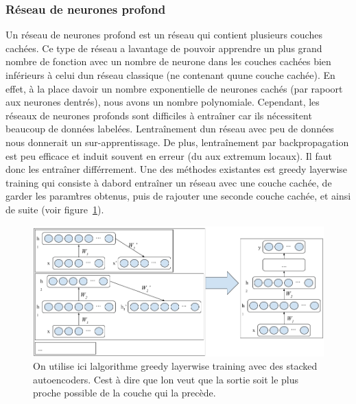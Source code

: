 \documentclass[11pt]{sdm}
\begin{document}
		\subsubsection{R\'eseau de neurones profond}
			Un r\'eseau de neurones profond est un r\'eseau qui contient plusieurs couches cach\'ees. Ce type de r\'eseau a l\textquotesingle avantage de pouvoir apprendre un plus grand nombre de fonction avec un nombre de neurone dans les couches cach\'ees bien inf\'erieurs \`a celui d\textquotesingle un r\'eseau classique (ne contenant qu\textquotesingle une couche cach\'ee). En effet, \`a la place d\textquotesingle avoir un nombre exponentielle de neurones cach\'es (par rapoort aux neurones d\textquotesingle entr\'es), nous avons un nombre polynomiale.
			Cependant, les r\'eseaux de neurones profonds sont difficiles \`a entra\^iner car ils n\'ecessitent beaucoup de donn\'ees label\'ees. L\textquotesingle entra\^inement d\textquotesingle un r\'eseau avec peu de donn\'ees nous donnerait un sur-apprentissage. De plus, l\textquotesingle entra\^inement par backpropagation est peu efficace et induit souvent en erreur (du aux extremum locaux). Il faut donc les entra\^iner diff\'errement.
			Une des m\'ethodes existantes est greedy layerwise training qui consiste \`a d\textquotesingle abord entra\^iner un r\'eseau avec une couche cach\'ee, de garder les param\`tres obtenus, puis de rajouter une seconde couche cach\'ee, et ainsi de suite (voir figure~\ref{fig:trainDeepNet}).

			\begin{figure}[!ht]
				\centering
				\includegraphics[scale=0.5,natwidth=919,natheight=412]{figures/trainDeepNetByGreedyLayerWise.png}
				\caption{On utilise ici l\textquotesingle algorithme greedy layerwise training avec des stacked autoencoders. C\textquotesingle est \`a dire que l\textquotesingle on veut que la sortie soit le plus proche possible de la couche qui la prec\`ede.}
				\label{fig:trainDeepNet}
			\end{figure}
\end{document}

